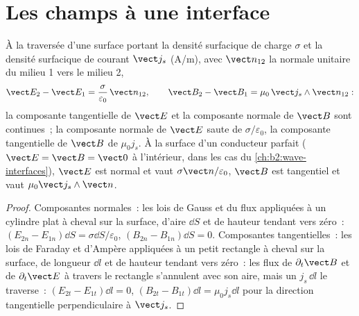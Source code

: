 \section{Les champs à une interface}

\begin{proposition}\label{prop:b2:maxwell-equations:boundary}
À la traversée d'une surface portant la densité surfacique de charge $\sigma$ et la
densité surfacique de courant $\vect j_s$ (\unit{A/m}), avec $\vect n_{12}$ la
normale unitaire du milieu 1 vers le milieu 2,
\[
\vect E_2 - \vect E_1 = \frac\sigma{\varepsilon_0}\,\vect n_{12} , \qquad
\vect B_2 - \vect B_1 = \mu_0\,\vect j_s\wedge\vect n_{12} :
\]
la composante tangentielle de $\vect E$ et la composante normale de $\vect B$
sont continues~; la composante normale de $\vect E$ saute de $\sigma/\varepsilon_0$,
la composante tangentielle de $\vect B$ de $\mu_0j_s$. À la surface d'un
conducteur parfait ($\vect E = \vect B = \vect 0$ à l'intérieur, dans les cas du
\cref{ch:b2:wave-interfaces}), $\vect E$ est normal et vaut $\sigma\vect n/
\varepsilon_0$, $\vect B$ est tangentiel et vaut $\mu_0\vect j_s\wedge\vect n$.
\end{proposition}

\begin{proof}
Composantes normales~: les lois de Gauss et du flux appliquées à un cylindre plat
à cheval sur la surface, d'aire $\dd S$ et de hauteur tendant vers zéro~: $(E_{2n}
- E_{1n})\dd S = \sigma\dd S/\varepsilon_0$, $(B_{2n} - B_{1n})\dd S = 0$. Composantes
tangentielles~: les lois de Faraday et d'Ampère appliquées à un petit rectangle
à cheval sur la surface, de longueur $\dd l$ et de hauteur tendant vers zéro~: les
flux de $\partial_t\vect B$ et de $\partial_t\vect E$ à travers le rectangle s'annulent
avec son aire, mais un  $j_s\,\dd l$ le traverse~:
$(E_{2t} - E_{1t})\dd l = 0$, $(B_{2t} - B_{1t})\dd l = \mu_0j_s\dd l$ pour la
direction tangentielle perpendiculaire à $\vect j_s$.
\end{proof}

